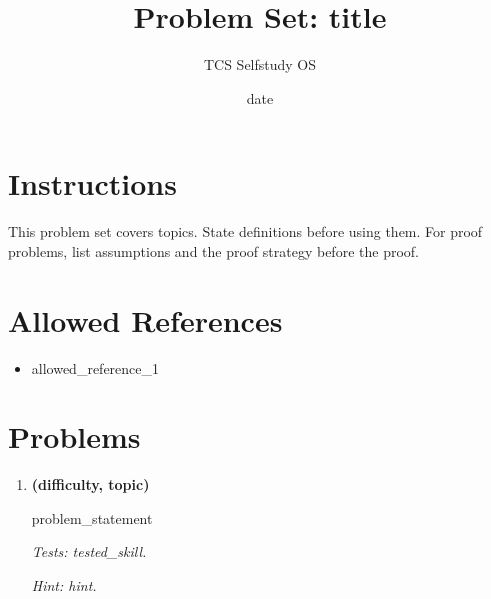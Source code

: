 \documentclass[11pt]{article}
\title{Problem Set: {{title}}}
\author{TCS Selfstudy OS}
\date{{{date}}}
\begin{document}
\maketitle

\section*{Instructions}

This problem set covers {{topics}}. State definitions before using them. For proof problems, list assumptions and the proof strategy before the proof.

\section*{Allowed References}

\begin{itemize}
  \item {{allowed_reference_1}}
\end{itemize}

\section*{Problems}

\begin{enumerate}[label=\textbf{Problem \arabic*.}]
  \item \textbf{({{difficulty}}, {{topic}})}

  {{problem_statement}}

  \emph{Tests: {{tested_skill}}.}

  \emph{Hint: {{hint}}.}

\end{enumerate}
\end{document}
